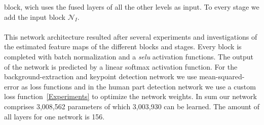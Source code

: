 block, wich uses the fused layers of all the other levels as input.
To every stage we add the input block $\mathcal{N}_I$.
\\\mbox{}\\
This network architecture resulted after several experiments and investigations of the estimated feature maps of the
different blocks and stages.
Every block is completed with batch normalization and a \textit{selu} activation functions.
The output of the network is predicted by a linear softmax activation function.
For the background-extraction and keypoint detection network we use mean-squared-error as loss functions and in the
human part detection network we use a custom loss function~\autoref{Experiments} to optimize the network weights.
In sum our network comprises 3,008,562 parameters of which 3,003,930 can be learned.
The amount of all layers for one network is 156.\\







